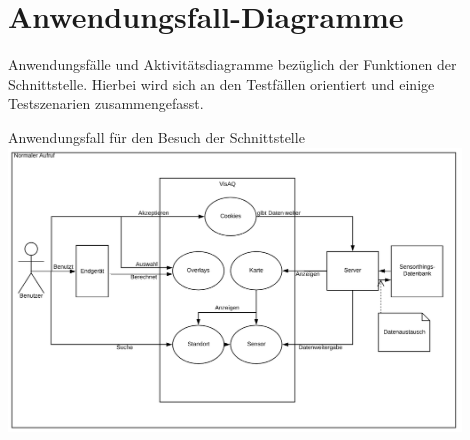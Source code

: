 \section{Anwendungsfall-Diagramme}
Anwendungsfälle und Aktivitätsdiagramme bezüglich der Funktionen der Schnittstelle. Hierbei wird sich an den Testfällen orientiert und einige Testszenarien zusammengefasst.
\newline

Anwendungsfall für den Besuch der Schnittstelle
\includegraphics[width=0.9\textwidth]{media/Anwendungsfall1} 
\newline

